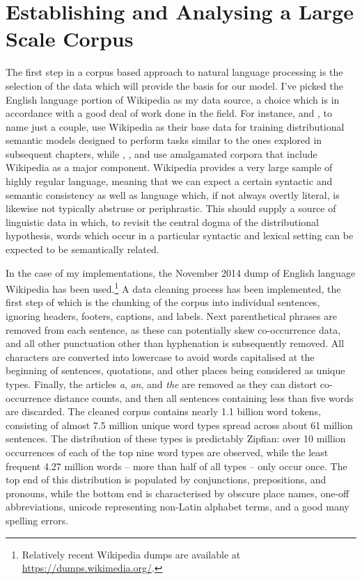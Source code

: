 \section{Establishing and Analysing a Large Scale Corpus} \label{sec:pmi}
The first step in a corpus based approach to natural language processing is the selection of the data which will provide the basis for our model.  I've picked the English language portion of Wikipedia as my data source, a choice which is in accordance with a good deal of work done in the field.  For instance, \cite{GabrilovichEA2007} and \cite{CollobertEA2008}, to name just a couple, use Wikipedia as their base data for training distributional semantic models designed to perform tasks similar to the ones explored in subsequent chapters, while \cite{BaroniEA2014}, \cite{PenningtonEA2014}, and \cite{GutierrezEA2016} use amalgamated corpora that include Wikipedia as a major component.  Wikipedia provides a very large sample of highly regular language, meaning that we can expect a certain syntactic and semantic consistency as well as language which, if not always overtly literal, is likewise not typically abstruse or periphrastic.  This should supply a source of linguistic data in which, to revisit the central dogma of the distributional hypothesis, words which occur in a particular syntactic and lexical setting can be expected to be semantically related.

In the case of my implementations, the November 2014 dump of English language Wikipedia has been used.\footnote{Relatively recent Wikipedia dumps are available at \url{https://dumps.wikimedia.org/}.}  A data cleaning process has been implemented, the first step of which is the chunking of the corpus into individual sentences, ignoring headers, footers, captions, and labels.  Next parenthetical phrases are removed from each sentence, as these can potentially skew co-occurrence data, and all other punctuation other than hyphenation is subsequently removed.  All characters are converted into lowercase to avoid words capitalised at the beginning of sentences, quotations, and other places being considered as unique types.  Finally, the articles \emph{a}, \emph{an}, and \emph{the} are removed as they can distort co-occurrence distance counts, and then all sentences containing less than five words are discarded.  The cleaned corpus contains nearly 1.1 billion word tokens, consisting of almost 7.5 million unique word types spread across about 61 million sentences.  The distribution of these types is predictably Zipfian: over 10 million occurrences of each of the top nine word types are observed, while the least frequent 4.27 million words -- more than half of all types -- only occur once.  The top end of this distribution is populated by conjunctions, prepositions, and pronouns, while the bottom end is characterised by obscure place names, one-off abbreviations, unicode representing non-Latin alphabet terms, and a good many spelling errors.

